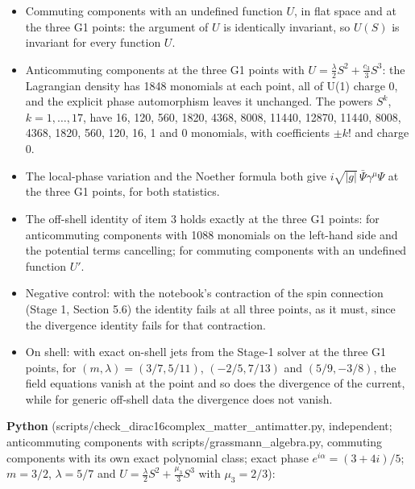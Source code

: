 \documentclass[11pt]{article}
\begin{document}
\begin{itemize}
\item Commuting components with an undefined function $U$, in flat space and at the three G1 points: the argument of $U$ is identically invariant, so $U(S)$ is invariant for every function $U$.
\item Anticommuting components at the three G1 points with $U=\tfrac\lambda2S^2+\tfrac{c_3}{3}S^3$: the Lagrangian density has 1848 monomials at each point, all of U(1) charge 0, and the explicit phase automorphism leaves it unchanged. The powers $S^k$, $k=1,\dots,17$, have 16, 120, 560, 1820, 4368, 8008, 11440, 12870, 11440, 8008, 4368, 1820, 560, 120, 16, 1 and 0 monomials, with coefficients $\pm k!$ and charge 0.
\item The local-phase variation and the Noether formula both give $i\sqrt{|g|}\,\bar\Psi\gamma^\mu\Psi$ at the three G1 points, for both statistics.
\item The off-shell identity of item 3 holds exactly at the three G1 points: for anticommuting components with 1088 monomials on the left-hand side and the potential terms cancelling; for commuting components with an undefined function $U'$.
\item Negative control: with the notebook's contraction of the spin connection (Stage 1, Section 5.6) the identity fails at all three points, as it must, since the divergence identity fails for that contraction.
\item On shell: with exact on-shell jets from the Stage-1 solver at the three G1 points, for $(m,\lambda)=(3/7,5/11)$, $(-2/5,7/13)$ and $(5/9,-3/8)$, the field equations vanish at the point and so does the divergence of the current, while for generic off-shell data the divergence does not vanish.
\end{itemize}

\textbf{Python} (scripts/check\_dirac16complex\_matter\_antimatter.py, independent; anticommuting components with scripts/grassmann\_algebra.py, commuting components with its own exact polynomial class; exact phase $e^{i\alpha}=(3+4i)/5$; $m=3/2$, $\lambda=5/7$ and $U=\tfrac\lambda2S^2+\tfrac{\mu_3}3S^3$ with $\mu_3=2/3$):
\end{document}
